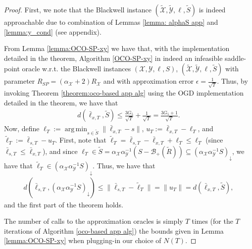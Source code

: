 \documentclass[a4paper,12pt]{article}
\DeclareMathOperator*{\argmin}{arg\,min}
\newcommand{\mY}{\mathcal{Y}}
\newcommand{\mX}{\mathcal{X}}
\newcommand{\tY}{\tilde{\mathcal{Y}}}
\newcommand{\tX}{\tilde{\mathcal{X}}}
\newcommand{\tS}{\tilde{S}}
\newcommand{\mB}{\mathcal{B}}
\newcommand{\oraclex}{\mathcal{O}_{\mX}}
\newcommand{\oracley}{\mathcal{O}_{\mY}}
\begin{document}
\begin{proof}
First, we note that the Blackwell instance $(\tX,\tY,\ell,\tS)$ is indeed approachable due to combination of Lemmas  \ref{lemma: alphaS app} and \ref{lemma:y_cond} (see appendix).


From Lemma \ref{lemma:OCO-SP-xy} we have that, with the implementation detailed in the theorem, Algorithm \ref{OCO-SP-xy} in indeed an infeasible saddle-point oracle w.r.t. the Blackwell instances $(\mX,\mY,\ell,S)$, $(\tX, \tY, \ell, \tS)$ with parameter $R_{SP} = (\alpha_{\mX}+2)R_{\mX}$ and with approximation error  $\epsilon = \frac{1}{\sqrt{T}}$. Thus, by invoking Theorem \ref{theorem:oco-based app  alg} using the OGD implementation detailed in the theorem, we have that
\begin{align*}
d\left(\bar{\ell}_{x,T} , \tS\right)\leq \frac{3 G_5}{\sqrt{T}} + \frac{1}{\sqrt{T}} = \frac{3G_5+1}{\sqrt{T}}.
\end{align*} 
Now, define $\ell_{T} := \argmin_{s \in \tS} \|\bar{\ell}_{x,T} - s\|$, $u_{T}:=\bar{\ell}_{x,T} - \ell_{T}$, and $\tilde{\ell}_{T}:=\bar{\ell}_{s,T} - u_{T}$. First, note that $\tilde{\ell}_T = \bar{\ell}_{s,T} - \bar{\ell}_{x,T} + \ell_T \leq \ell_T$ (since $\bar{\ell}_{s,T} \leq \bar{\ell}_{x,T}$), and since $\ell_T\in\tS = \alpha_{\mX}\alpha_{\mY}^{-1}(S-\mB_{+}(\tilde{R}))\subseteq\left({\alpha_{\mX}\alpha_{\mY}^{-1}S}\right)_{\downarrow}$, we have that $\tilde{\ell}_T\in(\alpha_{\mX}\alpha_{\mY}^{-1}S)_{\downarrow}$. Thus, we have that
\begin{align*}
d\left(\bar{\ell}_{s,T} ,{\left( \alpha_{\mX}\alpha_{\mY}^{-1} S\right)}_\downarrow \right) \leq \|\bar{\ell}_{s,T}-\tilde{\ell}_{T}\| =\|u_{T}\| = d\left(\bar{\ell}_{x,T} , \tS\right),
\end{align*}
and the first part of the theorem holds.

The number of calls to the approximation oracles is simply $T$ times (for the $T$ iterations of Algorithm \ref{oco-based app  alg}) the bounds given in Lemma \ref{lemma:OCO-SP-xy} when plugging-in our choice of $N(T)$.
\end{proof}
\end{document}
